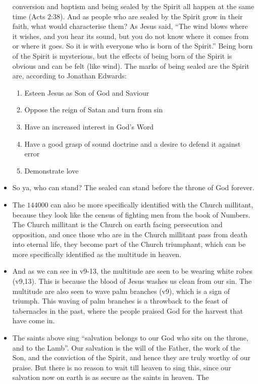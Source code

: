 \begin{itemize}
{conversion and baptism and being sealed by the Spirit all happen at the same
time (Acts 2:38).  And as people who are sealed by the Spirit grow in their
faith, what would characterise them?  As Jesus said, ``The
wind blows where it wishes, and you hear its sound, but you do not know where
it comes from or where it goes.  So it is with everyone who is born of the
Spirit.'' Being born of the Spirit is mysterious, but the effects of being
born of the Spirit is obvious and can be felt (like wind).  The marks of
being sealed are the Spirit are, according to Jonathan Edwards:
\begin{enumerate}
  \item{Esteen Jesus as Son of God and Saviour}
  \item{Oppose the reign of Satan and turn from sin}
  \item{Have an increased interest in God's Word}
  \item{Have a good grasp of sound doctrine and a desire to defend it against error}
  \item{Demonstrate love}
\end{enumerate}}
\item{So ya, who can stand?  The sealed can stand before the throne of God
forever.}
\item{The $144000$ can also be more specifically identified with the Church
millitant, because they look like the census of fighting men from the book of
Numbers.  The Church millitant is the Church on earth facing persecution and
opposition, and once those who are in the Church millitant pass from death
into eternal life, they become part of the Church triumphant, which can be
more specifically identified as the multitude in heaven.}
\item{And as we can see in v9-13, the multitude are seen to be wearing white
robes (v9,13).  This is because the blood of Jesus washes us clean from our
sin.  The multitude are also seen to wave palm branches (v9), which is a sign
of triumph.  This waving of palm branches is a throwback to the feast of
tabernacles in the past, where the people praised God for the harvest that
have come in.}
\item{The saints above sing ``salvation belongs to our God who sits on the
throne, and to the Lamb''.  Our salvation is the will of the Father, the work
of the Son, and the conviction of the Spirit, and hence they are truly worthy
of our praise.  But there is no reason to wait till heaven to sing this,
since our salvation now on earth is as secure as the saints in heaven.  The
}
\end{itemize}
